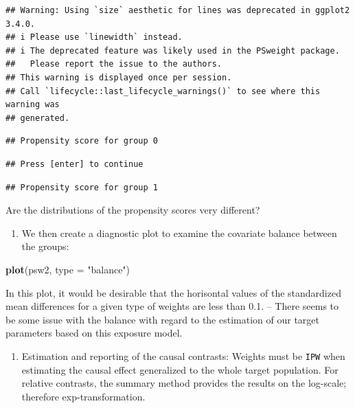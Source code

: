\documentclass[
]{book}
\newenvironment{Shaded}{\begin{snugshade}}{\end{snugshade}}
\newcommand{\AttributeTok}[1]{\textcolor[rgb]{0.13,0.29,0.53}{#1}}
\newcommand{\FunctionTok}[1]{\textcolor[rgb]{0.13,0.29,0.53}{\textbf{#1}}}
\newcommand{\NormalTok}[1]{#1}
\newcommand{\StringTok}[1]{\textcolor[rgb]{0.31,0.60,0.02}{#1}}
\providecommand{\tightlist}{%
  \setlength{\itemsep}{0pt}\setlength{\parskip}{0pt}}
\theoremstyle{definition}
\theoremstyle{definition}
\theoremstyle{definition}
\theoremstyle{definition}
\theoremstyle{remark}
\begin{document}
\begin{verbatim}
## Warning: Using `size` aesthetic for lines was deprecated in ggplot2 3.4.0.
## i Please use `linewidth` instead.
## i The deprecated feature was likely used in the PSweight package.
##   Please report the issue to the authors.
## This warning is displayed once per session.
## Call `lifecycle::last_lifecycle_warnings()` to see where this warning was
## generated.
\end{verbatim}

\begin{verbatim}
## Propensity score for group 0
\end{verbatim}

\begin{verbatim}
## Press [enter] to continue
\end{verbatim}

\begin{verbatim}
## Propensity score for group 1
\end{verbatim}

Are the distributions of the propensity scores very different?

\begin{enumerate}
\def\labelenumi{\arabic{enumi}.}
\setcounter{enumi}{2}
\tightlist
\item
  We then create a diagnostic plot to examine the covariate balance
  between the groups:
\end{enumerate}

\begin{Shaded}
\begin{Highlighting}[]
\FunctionTok{plot}\NormalTok{(psw2, }\AttributeTok{type =} \StringTok{"balance"}\NormalTok{)}
\end{Highlighting}
\end{Shaded}

In this plot, it would be desirable that the horisontal values of the
standardized mean differences for a given type of weights are less than
0.1. -- There seems to be some issue with the balance with regard to
the estimation of our target parameters based on this exposure model.

\begin{enumerate}
\def\labelenumi{\arabic{enumi}.}
\setcounter{enumi}{3}
\tightlist
\item
  Estimation and reporting of the causal contrasts: Weights must be
  \texttt{IPW} when estimating the causal effect generalized to the whole
  target population. For relative contrasts, the summary method
  provides the results on the log-scale; therefore
  exp-transformation.
\end{enumerate}
\end{document}
